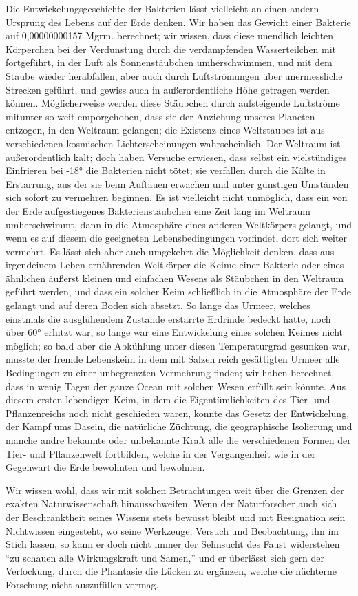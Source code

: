 \documentclass[a4paper, 11pt, oneside, english]{article}
\begin{document}
Die Entwickelungsgeschichte der Bakterien lässt vielleicht an einen andern Ursprung des Lebens auf der Erde denken. Wir haben das Gewicht einer Bakterie auf 0,00000000157 Mgrm. berechnet; wir wissen, dass diese unendlich leichten Körperchen bei der Verdunstung durch die verdampfenden Wasserteilchen mit fortgeführt, in der Luft als Sonnenstäubchen umherschwimmen, und mit dem Staube wieder herabfallen, aber auch durch Luftströmungen über unermessliche Strecken geführt, und gewiss auch in außerordentliche Höhe getragen werden können. Möglicherweise werden diese Stäubchen durch aufsteigende Luftströme mitunter so weit emporgehoben, dass sie der Anziehung unseres Planeten entzogen, in den Weltraum gelangen; die Existenz eines Weltstaubes ist aus verschiedenen kosmischen Lichterscheinungen wahrscheinlich. Der Weltraum ist außerordentlich kalt; doch haben Versuche erwiesen, dass selbst ein vielstündiges Einfrieren bei -18° die Bakterien nicht tötet; sie verfallen durch die Kälte in Erstarrung, aus der sie beim Auftauen erwachen und unter günstigen Umständen sich sofort zu vermehren beginnen. Es ist vielleicht nicht unmöglich, dass ein von der Erde aufgestiegenes Bakterienstäubchen eine Zeit lang im Weltraum umherschwimmt, dann in die Atmosphäre eines anderen Weltkörpers gelangt, und wenn es auf diesem die geeigneten Lebensbedingungen vorfindet, dort sich weiter vermehrt. Es lässt sich aber auch umgekehrt die Möglichkeit denken, dass aus irgendeinem Leben ernährenden Weltkörper die Keime einer Bakterie oder eines ähnlichen äußerst kleinen und einfachen Wesens als Stäubchen in den Weltraum geführt werden, und dass ein solcher Keim schließlich in die Atmosphäre der Erde gelangt und auf deren Boden sich absetzt. So lange das Urmeer, welches einstmals die ausglühendem Zustande erstarrte Erdrinde bedeckt hatte, noch über 60° erhitzt war, so lange war eine Entwickelung eines solchen Keimes nicht möglich; so bald aber die Abkühlung unter diesen Temperaturgrad gesunken war, musste der fremde Lebenskeim in dem mit Salzen reich gesättigten Urmeer alle Bedingungen zu einer unbegrenzten Vermehrung finden; wir haben berechnet, dass in wenig Tagen der ganze Ocean mit solchen Wesen erfüllt sein könnte. Aus diesem ersten lebendigen Keim, in dem die Eigentümlichkeiten des Tier- und Pflanzenreichs noch nicht geschieden waren, konnte das Gesetz der Entwickelung, der Kampf ums Dasein, die natürliche Züchtung, die geographische Isolierung und manche andre bekannte oder unbekannte Kraft alle die verschiedenen Formen der Tier- und Pflanzenwelt fortbilden, welche in der Vergangenheit wie in der Gegenwart die Erde bewohnten und bewohnen.

Wir wissen wohl, dass wir mit solchen Betrachtungen weit über die Grenzen der exakten Naturwissenschaft hinausschweifen. Wenn der Naturforscher auch sich der Beschränktheit seines Wissens stets bewusst bleibt und mit Resignation sein Nichtwissen eingesteht, wo seine Werkzeuge, Versuch und Beobachtung, ihn im Stich lassen, so kann er doch nicht immer der Sehnsucht des Faust widerstehen "`zu schauen alle Wirkungskraft und Samen,"' und er überlässt sich gern der Verlockung, durch die Phantasie die Lücken zu ergänzen, welche die nüchterne Forschung nicht auszufüllen vermag.
\end{document}

